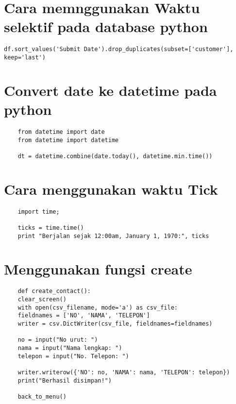 \documentclass[12pt]{article} %
\begin{document}
\section{Cara memnggunakan Waktu selektif pada database python}
\begin{lstlisting}
df.sort_values('Submit Date').drop_duplicates(subset=['customer'], keep='last')
\end{lstlisting}

\section {Convert date ke datetime pada python}
\begin{lstlisting}
	from datetime import date
	from datetime import datetime
		
	dt = datetime.combine(date.today(), datetime.min.time())
\end{lstlisting}

\section{Cara menggunakan waktu Tick}
\begin {lstlisting}
	import time; 
	
	ticks = time.time()
	print "Berjalan sejak 12:00am, January 1, 1970:", ticks
\end{lstlisting}

\section{Menggunakan fungsi create}
\begin{lstlisting}
	def create_contact():
	clear_screen()
	with open(csv_filename, mode='a') as csv_file:
	fieldnames = ['NO', 'NAMA', 'TELEPON']
	writer = csv.DictWriter(csv_file, fieldnames=fieldnames)
	
	no = input("No urut: ")
	nama = input("Nama lengkap: ")
	telepon = input("No. Telepon: ")
	
	writer.writerow({'NO': no, 'NAMA': nama, 'TELEPON': telepon})    
	print("Berhasil disimpan!")
	
	back_to_menu()
\end{lstlisting}
\end{document}
